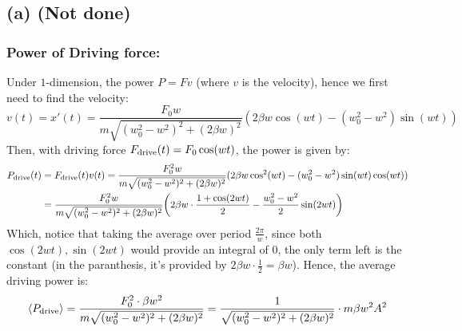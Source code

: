 \documentclass{article}
\DeclarePairedDelimiter{\paran}{(}{)}%
\DeclarePairedDelimiter{\bracket}{\langle}{\rangle}
\begin{document}
\subsection*{(a) (Not done)}
\subsubsection*{Power of Driving force:}
Under $1$-dimension, the power $P = Fv$ (where $v$ is the velocity), hence we first need to find the velocity:
\begin{equation}
    v(t)=x'(t) = \frac{F_0w}{m\sqrt{(w_0^2-w^2)^2+(2\beta w)^2}}(2\beta w\cos(wt)-(w_0^2-w^2)\sin(wt))
\end{equation}
Then, with driving force $F_{\textmd{drive}}(t)=F_0\cos(wt)$, the power is given by:
\begin{align}
    P_{\textmd{drive}}(t)&=F_{\textmd{drive}}(t)v(t) = \frac{F_0^2w}{m\sqrt{(w_0^2-w^2)^2+(2\beta w)^2}}(2\beta w\cos^2(wt)-(w_0^2-w^2)\sin(wt)\cos(wt))\\
    &=\frac{F_0^2w}{m\sqrt{(w_0^2-w^2)^2+(2\beta w)^2}}\paran*{2\beta w\cdot\frac{1+\cos(2wt)}{2}-\frac{w_0^2-w^2}{2}\sin(2wt)}
\end{align}
Which, notice that taking the average over period $\frac{2\pi}{w}$, since both $\cos(2wt),\sin(2wt)$ would provide an integral of $0$, the only term left is the constant (in the paranthesis, it's provided by $2\beta w \cdot \frac{1}{2}=\beta w$). Hence, the average driving power is:
\begin{equation}
    \bracket*{P_{\textmd{drive}}} = \frac{F_0^2\cdot\beta w^2}{m\sqrt{(w_0^2-w^2)^2+(2\beta w)^2}} = \frac{1}{\sqrt{(w_0^2-w^2)^2+(2\beta w)^2}}\cdot m\beta w^2A^2
\end{equation}
\end{document}
